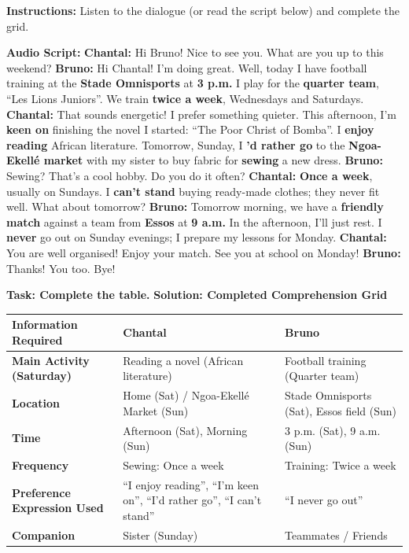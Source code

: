 \documentclass[11pt]{article}
\begin{document}
\begin{exoresolu}
\textbf{Instructions:} Listen to the dialogue (or read the script below) and complete the grid.

\textbf{Audio Script:}
\textbf{Chantal:} Hi Bruno! Nice to see you. What are you up to this weekend?
\textbf{Bruno:} Hi Chantal! I'm doing great. Well, today I have football training at the \textbf{Stade Omnisports} at \textbf{3 p.m.} I play for the \textbf{quarter team}, ``Les Lions Juniors''. We train \textbf{twice a week}, Wednesdays and Saturdays.
\textbf{Chantal:} That sounds energetic! I prefer something quieter. This afternoon, I'm \textbf{keen on} finishing the novel I started: ``The Poor Christ of Bomba''. I \textbf{enjoy reading} African literature. Tomorrow, Sunday, I \textbf{'d rather go} to the \textbf{Ngoa-Ekellé market} with my sister to buy fabric for \textbf{sewing} a new dress.
\textbf{Bruno:} Sewing? That's a cool hobby. Do you do it often?
\textbf{Chantal:} \textbf{Once a week}, usually on Sundays. I \textbf{can't stand} buying ready-made clothes; they never fit well. What about tomorrow?
\textbf{Bruno:} Tomorrow morning, we have a \textbf{friendly match} against a team from \textbf{Essos} at \textbf{9 a.m.} In the afternoon, I'll just rest. I \textbf{never} go out on Sunday evenings; I prepare my lessons for Monday.
\textbf{Chantal:} You are well organised! Enjoy your match. See you at school on Monday!
\textbf{Bruno:} Thanks! You too. Bye!

\textbf{Task: Complete the table.}
\tcblower
\textbf{Solution: Completed Comprehension Grid}

\begin{center}
\begin{tabularx}{\linewidth}{|l|X|X|}\hline
\textbf{Information Required} & \textbf{Chantal} & \textbf{Bruno} \\ \hline
\textbf{Main Activity (Saturday)} & Reading a novel (African literature) & Football training (Quarter team) \\ \hline
\textbf{Location} & Home (Sat) / Ngoa-Ekellé Market (Sun) & Stade Omnisports (Sat), Essos field (Sun) \\ \hline
\textbf{Time} & Afternoon (Sat), Morning (Sun) & 3 p.m. (Sat), 9 a.m. (Sun) \\ \hline
\textbf{Frequency} & Sewing: Once a week & Training: Twice a week \\ \hline
\textbf{Preference Expression Used} & ``I enjoy reading'', ``I'm keen on'', ``I'd rather go'', ``I can't stand'' & ``I never go out'' \\ \hline
\textbf{Companion} & Sister (Sunday) & Teammates / Friends \\ \hline
\end{tabularx}
\end{center}
\end{exoresolu}
\end{document}
